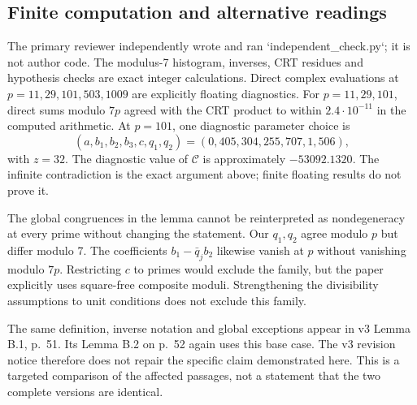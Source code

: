 \documentclass[10pt]{article}
\begin{document}
\subsection*{Finite computation and alternative readings}
The primary reviewer independently wrote and ran `independent\_check.py`; it is not author code. The modulus-7 histogram, inverses, CRT residues and hypothesis checks are exact integer calculations. Direct complex evaluations at \(p=11,29,101,503,1009\) are explicitly floating diagnostics. For \(p=11,29,101\), direct sums modulo \(7p\) agreed with the CRT product to within \(2.4\cdot10^{-11}\) in the computed arithmetic. At \(p=101\), one diagnostic parameter choice is \[(a,b_1,b_2,b_3,c,q_1,q_2)=(0,405,304,255,707,1,506),\] with \(z=32\). The diagnostic value of \(\mathcal C\) is approximately \(-53092.1320\). The infinite contradiction is the exact argument above; finite floating results do not prove it.\par
The global congruences in the lemma cannot be reinterpreted as nondegeneracy at every prime without changing the statement. Our \(q_1,q_2\) agree modulo \(p\) but differ modulo 7. The coefficients \(b_1-\bar q_jb_2\) likewise vanish at \(p\) without vanishing modulo \(7p\). Restricting \(c\) to primes would exclude the family, but the paper explicitly uses square-free composite moduli. Strengthening the divisibility assumptions to unit conditions does not exclude this family.\par
The same definition, inverse notation and global exceptions appear in v3 Lemma B.1, p. 51. Its Lemma B.2 on p. 52 again uses this base case. The v3 revision notice therefore does not repair the specific claim demonstrated here. This is a targeted comparison of the affected passages, not a statement that the two complete versions are identical.\par
\end{document}
